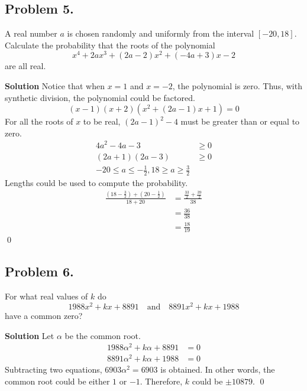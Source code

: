 \documentclass{article}
\newenvironment{solution}{\begin{trivlist}\item[]{\bf Solution}}{\qed \end{trivlist}}
\begin{document}
\subsection*{Problem 5.}
{\color {BrickRed}
A real number $a$ is chosen randomly and uniformly
from the interval $[-20, 18]$. Calculate the probability
that the roots of the polynomial
\[
x^4 + 2a x^3 + (2a - 2)x^2 + (-4a + 3)x - 2
\]
are all real.
}

\begin{solution}
Notice that when $x = 1$ and $x = -2$, the polynomial
is zero. Thus, with synthetic division, the polynomial
could be factored.
\[
(x - 1)(x + 2)(x^2 + (2a - 1)x + 1) = 0
\]
For all the roots of $x$ to be real, $(2a-1)^2 - 4$
must be greater than or equal to zero.
\begin{align*}
    4a^2 - 4a - 3 &\geq 0 \\
    (2a + 1)(2a - 3) &\geq 0 \\
    -20 \leq a \leq -\frac{1}{2}, 18 \geq a \geq \frac{3}{2}
\end{align*}
Lengths could be used to compute the probability.
\begin{align*}
    \frac{\left( 18 - \frac{3}{2} \right)
        + \left( 20 - \frac{1}{2} \right)}{18 + 20}
    &= \frac{\frac{33}{2} + \frac{39}{2}}{38} \\
    &= \frac{36}{38} \\
    &= \boxed{\frac{18}{19}}
\end{align*}
\end{solution}

\subsection*{Problem 6.}
{\color {BrickRed}
For what real values of $k$ do
\[
1988x^2 + kx + 8891 \quad \text{and} \quad 8891x^2 + kx + 1988
\]
have a common zero?
}

\begin{solution}
Let $\alpha$ be the common root.
\begin{align*}
    1988\alpha^2 + k\alpha + 8891 &= 0 \\
    8891\alpha^2 + k\alpha + 1988 &= 0
\end{align*}
Subtracting two equations, $6903\alpha^2 = 6903$ is obtained.
In other words, the common root could be either $1$ or $-1$.
Therefore, $k$ could be $\boxed{\pm 10879}$.
\end{solution}
\end{document}

